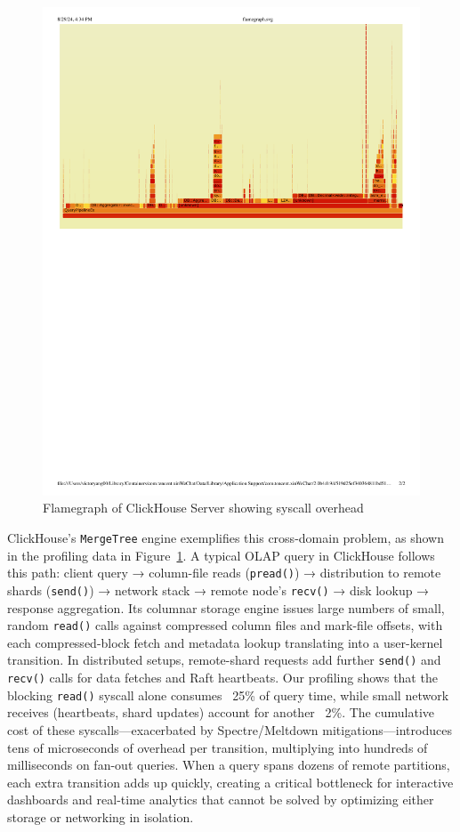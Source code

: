 \documentclass[sigconf,10pt]{acmart}
\begin{document}
\begin{figure}[h]
\centering
\includegraphics[width=\columnwidth]{img/flamegraph.pdf}
\caption{Flamegraph of ClickHouse Server showing syscall overhead}\label{fig:profiling}
\end{figure}

ClickHouse's\cite{clickhouse} \texttt{MergeTree} engine exemplifies this cross-domain problem, as shown in the profiling data in Figure~\ref{fig:profiling}. A typical OLAP query in ClickHouse follows this path: client query → column-file reads (\texttt{pread()}) → distribution to remote shards (\texttt{send()}) → network stack → remote node's \texttt{recv()} → disk lookup → response aggregation. Its columnar storage engine issues large numbers of small, random \texttt{read()} calls against compressed column files and mark-file offsets, with each compressed-block fetch and metadata lookup translating into a user-kernel transition. In distributed setups, remote-shard requests add further \texttt{send()} and \texttt{recv()} calls for data fetches and Raft heartbeats. Our profiling shows that the blocking \texttt{read()} syscall alone consumes ~25\% of query time, while small network receives (heartbeats, shard updates) account for another ~2\%. The cumulative cost of these syscalls—exacerbated by Spectre/Meltdown mitigations—introduces tens of microseconds of overhead per transition, multiplying into hundreds of milliseconds on fan-out queries. When a query spans dozens of remote partitions, each extra transition adds up quickly, creating a critical bottleneck for interactive dashboards and real-time analytics that cannot be solved by optimizing either storage or networking in isolation.
\end{document}
